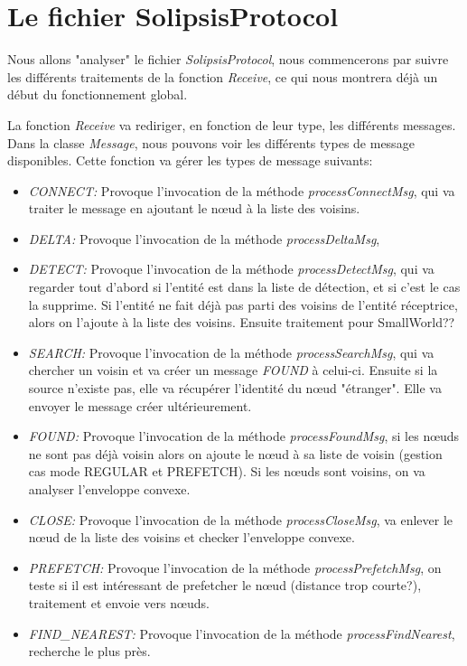 \documentclass[11pt,a4paper]{article}
\begin{document}
\section{Le fichier SolipsisProtocol}
Nous allons "analyser" le fichier \textit{SolipsisProtocol}, nous commencerons par suivre les différents traitements de la fonction \textit{Receive}, ce qui nous montrera déjà un début du fonctionnement global. 
\par La fonction \textit{Receive} va rediriger, en fonction de leur type, les différents messages. Dans la classe \textit{Message}, nous pouvons voir les différents types de message disponibles. Cette fonction va gérer les types de message suivants:
\begin{itemize}
	\renewcommand{\labelitemi}{$\bullet$}
	\item \textit{CONNECT:} Provoque l'invocation de la méthode \textit{processConnectMsg}, qui va traiter le message en ajoutant le nœud à la liste des voisins. 
	\item \textit{DELTA:} Provoque l'invocation de la méthode \textit{processDeltaMsg}, 
	\item \textit{DETECT:} Provoque l'invocation de la méthode \textit{processDetectMsg}, qui va regarder tout d'abord si l'entité est dans la liste de détection, et si c'est le cas la supprime. Si l'entité ne fait déjà pas parti des voisins de l'entité réceptrice, alors on l'ajoute à la liste des voisins. Ensuite traitement pour SmallWorld??
	\item \textit{SEARCH:} Provoque l'invocation de la méthode \textit{processSearchMsg}, qui va chercher un voisin et va créer un message \textit{FOUND} à celui-ci. Ensuite si la source n'existe pas, elle va récupérer l'identité du nœud "étranger". Elle va envoyer le message créer ultérieurement. 
	\item \textit{FOUND:} Provoque l'invocation de la méthode \textit{processFoundMsg}, si les nœuds ne sont pas déjà voisin alors on ajoute le nœud à sa liste de voisin (gestion cas mode REGULAR et PREFETCH). Si les nœuds sont voisins, on va analyser l'enveloppe convexe.
	\item \textit{CLOSE:} Provoque l'invocation de la méthode \textit{processCloseMsg}, va enlever le nœud de la liste des voisins et checker l'enveloppe convexe.
	\item \textit{PREFETCH:} Provoque l'invocation de la méthode \textit{processPrefetchMsg}, on teste si il est intéressant de prefetcher le nœud (distance trop courte?), traitement et envoie vers nœuds.
	\item \textit{FIND\_NEAREST:} Provoque l'invocation de la méthode \textit{processFindNearest}, recherche le plus près.
\end{itemize}

\newpage




 
\end{document}
